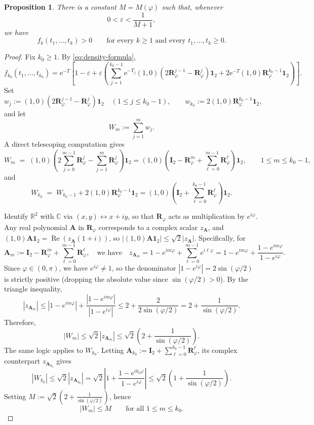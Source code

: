 \documentclass[10pt,a4paper]{amsart}
\newtheorem{proposition}{Proposition}
\newcommand{\e}{\mathrm{e}}
\begin{document}
\begin{proposition}\label{prop:positivity}
There is a constant $M=M(\varphi)$ such that, whenever
\[
0<\varepsilon<\frac{1}{M+1},
\]
we have
\[
f_k(t_1,\dots,t_k)>0
\qquad\text{for every }k\ge 1\text{ and every }t_1,\dots,t_k\ge 0.
\]
\end{proposition}

\begin{proof}
Fix $k_0\ge 1$. By \eqref{eq:density-formula},
\[
f_{k_0}(t_1,\dots,t_{k_0})
=
\e^{-T}
\left[
1-\varepsilon
+
\varepsilon
\left(
\sum_{j=1}^{{k_0}-1}
\e^{-T_j}(1,0)(2\bm{R}_\varphi^{j-1}-\bm{R}_\varphi^j)\bm{1}_2
+
2\e^{-T}(1,0)\bm{R}_\varphi^{{k_0}-1}\bm{1}_2
\right)
\right].
\]
Set
\[
w_j:=(1,0)(2\bm{R}_\varphi^{j-1}-\bm{R}_\varphi^j)\bm{1}_2
\quad (1\le j\le {k_0}-1),
\qquad
w_{k_0}:=2(1,0)\bm{R}_\varphi^{{k_0}-1}\bm{1}_2,
\]
and let
\[
W_m:=\sum_{j=1}^m w_j.
\]
A direct telescoping computation gives
\[
W_m
\;=\; (1,0)\left( 2\sum_{j=0}^{m-1}\bm{R}_\varphi^j - \sum_{j=1}^{m}\bm{R}_\varphi^j \right)\bm{1}_2
=
(1,0)\left(\bm{I}_2-\bm{R}_\varphi^m+\sum_{\ell=0}^{m-1}\bm{R}_\varphi^\ell\right)\bm{1}_2,
\qquad 1\le m\le {k_0}-1,
\]
and
\[
W_{k_0}
\;=\; W_{k_0-1} + 2(1,0)\bm{R}_\varphi^{k_0-1}\bm{1}_2
=
(1,0)\left(\bm{I}_2+\sum_{\ell=0}^{{k_0}-1}\bm{R}_\varphi^\ell\right)\bm{1}_2.
\]

Identify $\mathbb{R}^2$ with $\mathbb{C}$ via $(x,y)\leftrightarrow x+iy$, so that $\bm{R}_\varphi$ acts as multiplication by $e^{i\varphi}$. Any real polynomial $\bm{A}$ in $\bm{R}_\varphi$ corresponds to a complex scalar $z_{\bm{A}}$, and $(1,0)\bm{A}\bm{1}_2 = \operatorname{Re}(z_{\bm{A}}(1+i))$, so $|(1,0)\bm{A}\bm{1}_2|\le\sqrt{2}|z_{\bm{A}}|$. Specifically, for
\[
\bm{A}_m := \bm{I}_2-\bm{R}_\varphi^m+\sum_{\ell=0}^{m-1}\bm{R}_\varphi^\ell,
\quad\mbox{we have}\quad
z_{\bm{A}_m} = 1-e^{im\varphi}+\sum_{\ell=0}^{m-1}e^{i\ell\varphi} = 1-e^{im\varphi}+\frac{1-e^{im\varphi}}{1-e^{i\varphi}}.
\]
Since \(\varphi\in(0,\pi)\), we have \(e^{i\varphi}\neq 1\), so the denominator \(|1-e^{i\varphi}|=2\sin(\varphi/2)\) is strictly positive (dropping the absolute value since \(\sin(\varphi/2)>0\)). By the triangle inequality,
\[
|z_{\bm{A}_m}|
\le
|1-e^{im\varphi}|+\frac{|1-e^{im\varphi}|}{|1-e^{i\varphi}|}
\le
2+\frac{2}{2\sin(\varphi/2)}
=
2+\frac{1}{\sin(\varphi/2)}.
\]
Therefore,
\[
|W_m| \le \sqrt{2}|z_{\bm{A}_m}| \le \sqrt{2}\left(2+\frac{1}{\sin(\varphi/2)}\right).
\]
The same logic applies to \(W_{k_0}\). Letting \(\bm{A}_{k_0} := \bm{I}_2+\sum_{\ell=0}^{k_0-1}\bm{R}_\varphi^\ell\), its complex counterpart \(z_{\bm{A}_{k_0}}\) gives
\[
|W_{k_0}|
\le
\sqrt{2}|z_{\bm{A}_{k_0}}|
=
\sqrt{2}\left|1+\frac{1-e^{ik_0\varphi}}{1-e^{i\varphi}}\right|
\le
\sqrt{2}\left(1+\frac{1}{\sin(\varphi/2)}\right).
\]
Setting \(M:=\sqrt{2}\left(2+\frac{1}{\sin(\varphi/2)}\right)\), hence
\[
|W_m|\le M
\qquad\text{for all }1\le m\le k_0.
\]


\end{proof}
\end{document}
